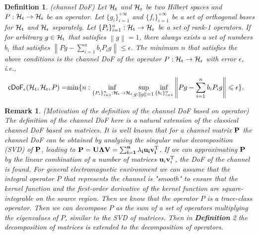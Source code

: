\documentclass[12pt,draftclsnofoot,journal,onecolumn]{IEEEtran}
\newtheorem{definition}{Definition}
\newtheorem{remark}{Remark}
\begin{document}
\begin{definition}
		(channel DoF) Let $\mathcal{H}_{\rm t}$ and $\mathcal{H}_{\rm r}$ be two Hilbert spaces and $P:\mathcal{H}_{\rm t} \rightarrow \mathcal{H}_{\rm r}$ be an operator. Let $\{g_i\}_{i=1}^{+\infty}$ and $\{f_i\}_{i=1}^{+\infty}$ be a set of orthogonal bases for $\mathcal{H}_{\rm t}$ and $\mathcal{H}_{\rm r}$ separately. Let $\{P_i\}_{i=1}^n: \mathcal{H}_{\rm t} \rightarrow \mathcal{H}_{\rm r}$ be a set of rank-1 operators. 
		If for arbitrary $g \in \mathcal{H}_{\rm t}$ that satisfies $\left\| g \right\|=1$, there always exists a set of numbers $b_i$ that satisfies $\left\| Pg-\sum_{i=1}^{n} b_iP_ig  \right\| \leqslant \epsilon$. The minimum $n$ that satisfies the above conditions is the channel DoF of the operator $P: \mathcal{H}_{\rm t} \rightarrow \mathcal{H}_{\rm r}$ with error $\epsilon$, i.e., 
		\begin{equation}
			\begin{aligned}
			\mathsf{cDoF}_{\epsilon} (\mathcal{H}_{\rm t},\mathcal{H}_{\rm r},P) =& {\rm min}\{ n: \underset{\{P_i\}_{i=1}^n: \mathcal{H}_{\rm t} \rightarrow \mathcal{H}_{\rm r}}{\rm inf} \sup_{g: \left\| g \right\|=1} \inf_{\{b_i\}_{i=1}^n} \left\| Pg-\sum_{i=1}^{n} b_iP_ig  \right\| \leqslant \epsilon  \}.
			\end{aligned}
		\end{equation}
	\end{definition}
	
	\begin{remark}
		(Motivation of the definition of the channel DoF based on operator)
		The definition of the channel DoF here is a natural extension of the classical channel DoF based on matrices. It is well known that for a channel matrix $\bf{P}$ the channel DoF can be obtained by analyzing the singular value decomposition (SVD) of $\bf{P}$, leading to ${\bf P} = {\bf U}\boldsymbol{\Lambda}\bf{V} = \sum_{i=1}^n \lambda_i {\bf u}_i{\bf v}_i^{\rm T}$. 
		If we can approximating ${\bf P}$ by the linear combination of a number of matrices ${\bf u}_i{\bf v}_i^{\rm T}$, the DoF of the channel is found. For general electromagnetic environment we can assume that the integral operator $P$ that represents the channel is "smooth" to ensure that the kernel function and the first-order derivative of the kernel function are square-integrable on the source region. Then we know that the operator $P$ is a trace-class operator\cite{bornemann2010numerical}. Then we can decompose $P$ as the sum of a set of operators multiplying the eigenvalues of $P$, similar to the SVD of matrices. Then in {\bf Definition} 2 the decomposition of matrices is extended to the decomposition of operators.
	\end{remark}
	
\end{document}
